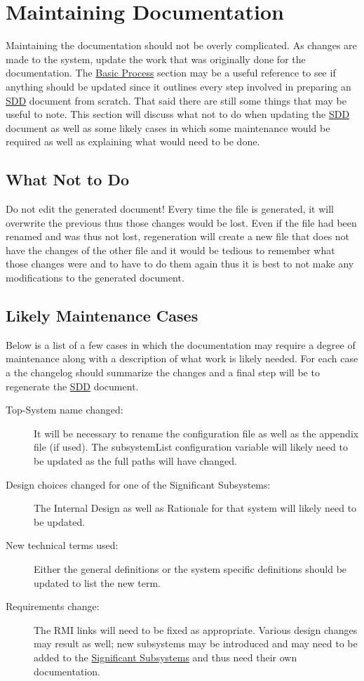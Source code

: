 \documentclass{mcscert}
\newcommand{\sigsubsnolink}{Significant Subsystems} %
\newcommand{\sigsubs}{\hyperref[def:sigsubs]{\sigsubsnolink{}}}
\begin{document}
\section{Maintaining Documentation}
Maintaining the documentation should not be overly complicated.	
As changes are made to the system, update the work that was originally done for the documentation. 
The \hyperref[sec:basic-proc]{Basic Process} section may be a useful reference to see if anything should be updated since it outlines every step involved in preparing an \hyperref[acr:sdd]{SDD} document from scratch. 
That said there are still some things that may be useful to note. 
This section will discuss what not to do when updating the \hyperref[acr:sdd]{SDD} document as well as some likely cases in which some maintenance would be required as well as explaining what would need to be done.
	
	\subsection{What Not to Do}	
	Do not edit the generated document!	Every time the file is generated, it will overwrite the previous thus those changes would be lost. 
	Even if the file had been renamed and was thus not lost, regeneration will create a new file that does not have the changes of the other file and it would be tedious to remember what those changes were and to have to do them again thus it is best to not make any modifications to the generated document.
	
	\subsection{Likely Maintenance Cases}
	Below is a list of a few cases in which the documentation may require a degree of maintenance along with a description of what work is likely needed. 
	For each case a the changelog should summarize the changes and a final step will be to regenerate the \hyperref[acr:sdd]{SDD} document.
	
	\begin{description}
		\item[Top-System name changed:] It will be necessary to rename the configuration file as well as the appendix file (if used). The subsystemList configuration variable will likely need to be updated as the full paths will have changed.
		\item[Design choices changed for one of the Significant Subsystems:] The Internal Design as well as Rationale for that system will likely need to be updated.
		\item[New technical terms used:] Either the general definitions or the system specific definitions should be updated to list the new term.
		\item[Requirements change:] The RMI links will need to be fixed as appropriate. 
		Various design changes may result as well; new subsystems may be introduced and may need to be added to the \sigsubs{} and thus need their own documentation.
	\end{description}
	
\end{document}
